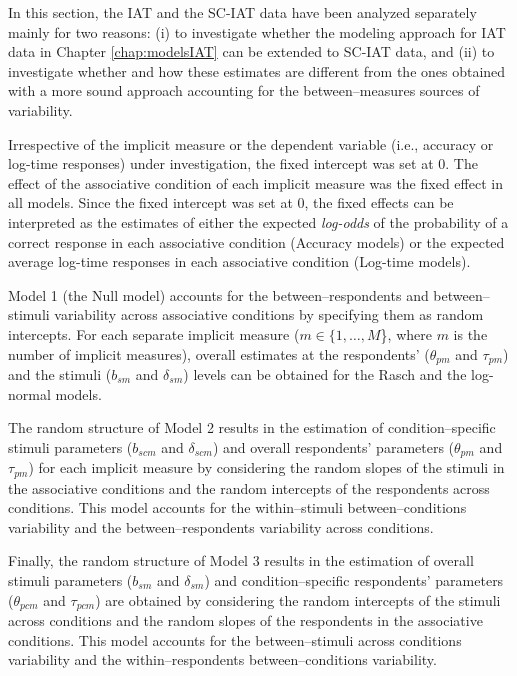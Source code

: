 \documentclass[12pt]{book}
\begin{document}
In this section, the IAT and the SC-IAT data have been analyzed separately mainly for two reasons: (i) to investigate whether the modeling approach for IAT data in Chapter \ref{chap:modelsIAT} can be extended to SC-IAT data, and (ii) to investigate whether and how these estimates are different from the ones obtained with a more sound approach accounting for the between--measures sources of variability.

Irrespective of the implicit measure or the dependent variable (i.e., accuracy or log-time responses) under investigation, the fixed intercept was set at $0$. 
The effect of the associative condition of each implicit measure was the fixed effect in all models. Since the fixed intercept was set at $0$, the fixed effects can be interpreted as the estimates of either the expected \emph{log-odds} of the probability of a correct response in each associative condition (Accuracy models) or the expected average log-time responses in each associative condition (Log-time models).

Model 1 (the Null model) accounts for the between--respondents and between--stimuli variability across associative conditions by specifying them as random intercepts.
For each separate implicit measure ($m \in \{1,\ldots, M$\}, where $m$ is the number of implicit measures), overall estimates at the respondents' ($\theta_{pm}$ and $\tau_{pm}$) and the stimuli ($b_{sm}$ and $\delta_{sm}$) levels can be obtained for the Rasch and the log-normal models.

The random structure of Model 2 results in the estimation of condition--specific stimuli parameters ($b_{scm}$ and $\delta_{scm}$) and overall respondents' parameters ($\theta_{pm}$ and $\tau_{pm}$) for each implicit measure by considering the random slopes of the stimuli in the associative conditions and the random intercepts of the respondents across conditions. 
This model accounts for the within--stimuli between--conditions variability and the between--respondents variability across conditions.

Finally, the random structure of Model 3 results in the estimation of overall stimuli parameters ($b_{sm}$ and $\delta_{sm}$) and condition--specific respondents' parameters ($\theta_{pcm}$ and $\tau_{pcm}$) are obtained by considering the random intercepts of the stimuli across conditions and the random slopes of the respondents in the associative conditions. This model accounts for the between--stimuli across conditions variability and the within--respondents between--conditions variability. 
 
\end{document}

